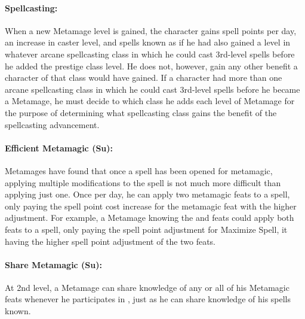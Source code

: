 \paragraph{Spellcasting:} When a new Metamage level is gained, the character gains spell points per day, an increase in caster level, and spells known as if he had also gained a level in whatever arcane spellcasting class in which he could cast 3rd-level spells before he added the prestige class level. 
He does not, however, gain any other benefit a character of that class would have gained. 
If a character had more than one arcane spellcasting class in which he could cast 3rd-level spells before he became a Metamage, he must decide to which class he adds each level of Metamage for the purpose of determining what spellcasting class gains the benefit of the spellcasting advancement.


\paragraph{Efficient Metamagic (Su):}
Metamages have found that once a spell has been opened for metamagic, applying multiple modifications to the spell is not much more difficult than applying just one. 
Once per day, he can apply two metamagic feats to a spell, only paying the spell point cost increase for the metamagic feat with the higher adjustment. For example, a Metamage knowing the  and  feats could apply both feats to a spell, only paying the spell point adjustment for Maximize Spell, it having the higher spell point adjustment of the two feats.

\paragraph{Share Metamagic (Su):}
At 2nd level, a Metamage can share knowledge of any or all of his Metamagic feats whenever he participates in , just as he can share knowledge of his spells known.

